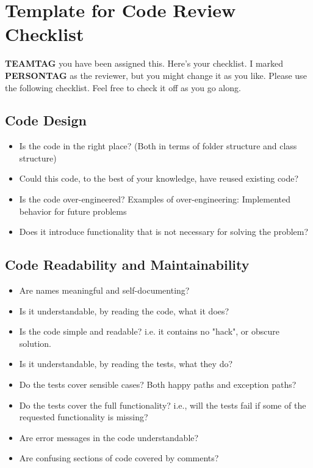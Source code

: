 \chapter{Template for Code Review Checklist} \label{app:code-review-checklist}
\textbf{TEAMTAG} you have been assigned this. 
Here's your checklist. 
I marked \textbf{PERSONTAG} as the reviewer, but you might change it as you like. 
Please use the following checklist. 
Feel free to check it off as you go along.

\section{Code Design}
\begin{itemize}
\item Is the code in the right place? (Both in terms of folder
 structure and class structure)
\item Could this code, to the best of your knowledge, have reused
 existing code?
\item Is the code over-engineered? Examples of over-engineering:
 Implemented behavior for future problems
\item Does it introduce functionality that is not necessary for
 solving the problem?
\end{itemize}

\section{Code Readability and Maintainability}
\begin{itemize}
\item Are names meaningful and self-documenting?
\item Is it understandable, by reading the code, what it does?
\item Is the code simple and readable? i.e. it contains no "hack",
 or obscure solution.
\item Is it understandable, by reading the tests, what they do?
\item Do the tests cover sensible cases? Both happy paths and
 exception paths?
\item Do the tests cover the full functionality? i.e., will the
 tests fail if some of the requested functionality is missing?
\item Are error messages in the code understandable?
\item Are confusing sections of code covered by comments?
\end{itemize}

